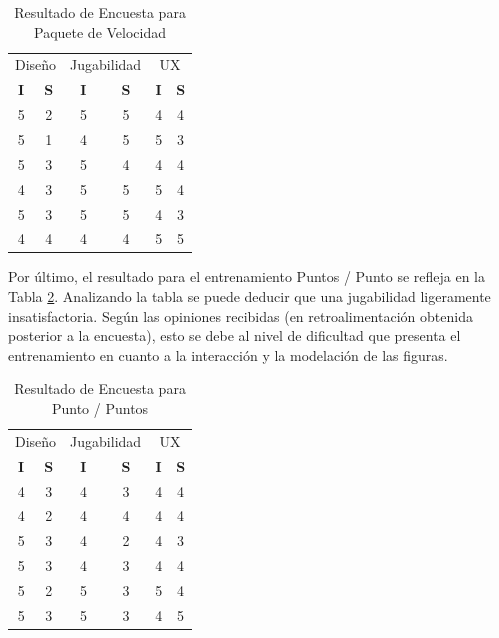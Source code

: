 \documentclass[conference]{IEEEtran}
\begin{document}
\begin{table}[htpb!]
\centering
\caption{Resultado de Encuesta para Paquete de Velocidad}
\label{tb:table2}
\begin{tabular}{@{}cc|cc|cc@{}}
\toprule
\multicolumn{2}{c}{Diseño} & \multicolumn{2}{c}{Jugabilidad} & \multicolumn{2}{c}{UX}  \\
\textbf{I}   & \textbf{S}  & \textbf{I}     & \textbf{S}     & \textbf{I} & \textbf{S} \\
5            & 2           & 5              & 5              & 4          & 4          \\
5            & 1           & 4              & 5              & 5          & 3          \\
5            & 3           & 5              & 4              & 4          & 4          \\
4            & 3           & 5              & 5              & 5          & 4          \\
5            & 3           & 5              & 5              & 4          & 3          \\
4            & 4           & 4              & 4              & 5          & 5          \\ \bottomrule
\end{tabular}
\end{table}

Por último, el resultado para el entrenamiento Puntos / Punto se refleja en la Tabla \ref{tb:table3}. Analizando la tabla se puede deducir que una jugabilidad ligeramente insatisfactoria. Según las opiniones recibidas (en retroalimentación obtenida posterior a la encuesta), esto se debe al nivel de dificultad que presenta el entrenamiento en cuanto a la interacción y la modelación de las figuras.

\begin{table}[htpb!]
\centering
\caption{Resultado de Encuesta para Punto / Puntos}
\label{tb:table3}
\begin{tabular}{@{}cc|cc|cc@{}}
\toprule
\multicolumn{2}{c}{Diseño} & \multicolumn{2}{c}{Jugabilidad} & \multicolumn{2}{c}{UX}  \\
\textbf{I}   & \textbf{S}  & \textbf{I}     & \textbf{S}     & \textbf{I} & \textbf{S} \\
4            & 3           & 4              & 3              & 4          & 4          \\
4            & 2           & 4              & 4              & 4          & 4          \\
5            & 3           & 4              & 2              & 4          & 3          \\
5            & 3           & 4              & 3              & 4          & 4          \\
5            & 2           & 5              & 3              & 5          & 4          \\
5            & 3           & 5              & 3              & 4          & 5          \\ \bottomrule
\end{tabular}
\end{table}
\end{document}

